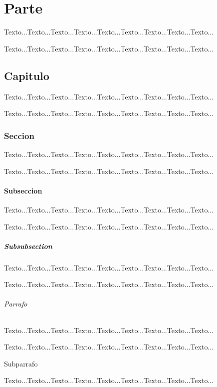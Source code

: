 \cleardoublepage

\let\cleardoublepage\clearpage
\part{Parte}
Texto...Texto...Texto...Texto...Texto...Texto...Texto...Texto...Texto...

Texto...Texto...Texto...Texto...Texto...Texto...Texto...Texto...Texto...
\chapter{Capitulo}
Texto...Texto...Texto...Texto...Texto...Texto...Texto...Texto...Texto...

Texto...Texto...Texto...Texto...Texto...Texto...Texto...Texto...Texto...
\section{Seccion} 
Texto...Texto...Texto...Texto...Texto...Texto...Texto...Texto...Texto...

Texto...Texto...Texto...Texto...Texto...Texto...Texto...Texto...Texto...
\subsection{Subseccion}
Texto...Texto...Texto...Texto...Texto...Texto...Texto...Texto...Texto...

Texto...Texto...Texto...Texto...Texto...Texto...Texto...Texto...Texto...
\subsubsection{Subsubsection}
Texto...Texto...Texto...Texto...Texto...Texto...Texto...Texto...Texto...

Texto...Texto...Texto...Texto...Texto...Texto...Texto...Texto...Texto...
\paragraph{Parrafo}
Texto...Texto...Texto...Texto...Texto...Texto...Texto...Texto...Texto...

Texto...Texto...Texto...Texto...Texto...Texto...Texto...Texto...Texto...
\subparagraph{Subparrafo}
Texto...Texto...Texto...Texto...Texto...Texto...Texto...Texto...Texto...

